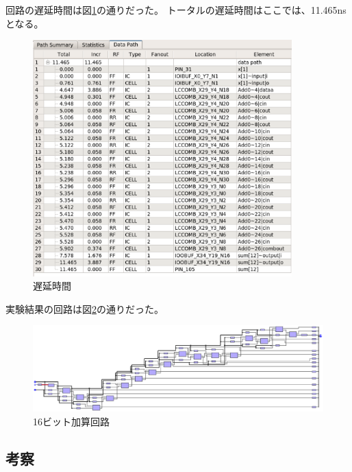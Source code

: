 \documentclass[uplatex]{jsarticle}
\begin{document}
回路の遅延時間は図\ref{fig:08}の通りだった。
トータルの遅延時間はここでは、11.465nsとなる。

\begin{figure}[htb]
  \begin{center}
    \includegraphics[width=10cm]{images/fig08.eps}
    \caption{遅延時間}
    \label{fig:08}
  \end{center}
\end{figure}

実験結果の回路は図\ref{fig:09}の通りだった。

\begin{figure}[htb]
  \begin{center}
    \includegraphics[width=13cm]{images/fig09.eps}
    \caption{16ビット加算回路}
    \label{fig:09}
  \end{center}
\end{figure}


\subsection{考察}

\end{document}
